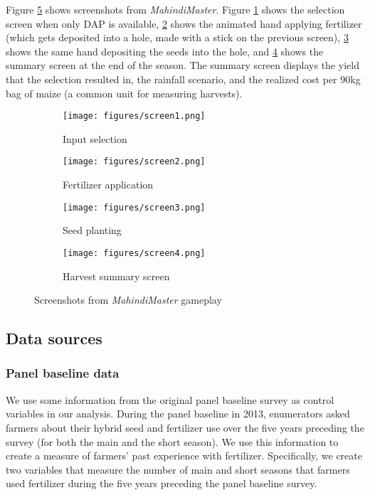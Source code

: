 \documentclass[12pt,letterpaper]{article}
\begin{document}
Figure \ref{fig:screenshots} shows screenshots from \textit{MahindiMaster}. Figure \ref{fig:screen1} shows the selection screen when only DAP is available, \ref{fig:screen2} shows the animated hand applying fertilizer (which gets deposited into a hole, made with a stick on the previous screen), \ref{fig:screen3} shows the same hand depositing the seeds into the hole, and \ref{fig:screen4} shows the summary screen at the end of the season. The summary screen displays the yield that the selection resulted in, the rainfall scenario, and the realized cost per 90kg bag of maize (a common unit for measuring harvests). 

\begin{figure}
\begin{subfigure}{.5\textwidth}
  \centering
  \texttt{[image: figures/screen1.png]}
  \caption{Input selection}
  \label{fig:screen1}
\end{subfigure}%
\begin{subfigure}{.5\textwidth}
  \centering
  \texttt{[image: figures/screen2.png]}
  \caption{Fertilizer application}
  \label{fig:screen2}
\end{subfigure}
\begin{subfigure}{.5\textwidth}
  \centering
  \texttt{[image: figures/screen3.png]}
  \caption{Seed planting}
  \label{fig:screen3}
\end{subfigure}
\begin{subfigure}{.5\textwidth}
  \centering
  \texttt{[image: figures/screen4.png]}
  \caption{Harvest summary screen}
  \label{fig:screen4}
\end{subfigure}
\caption{Screenshots from \textit{MahindiMaster} gameplay}
\label{fig:screenshots}
\end{figure}


\subsection{Data sources}

\subsubsection{Panel baseline data}\label{sec:panel_base_data}

We use some information from the original panel baseline survey as control variables in our analysis. During the panel baseline in 2013, enumerators asked farmers about their hybrid seed and fertilizer use over the five years preceding the survey (for both the main and the short season). We use this information to create a measure of farmers' past experience with fertilizer. Specifically, we create two variables that measure the number of main and short seasons that farmers used fertilizer during the five years preceding the panel baseline survey.
\end{document}
